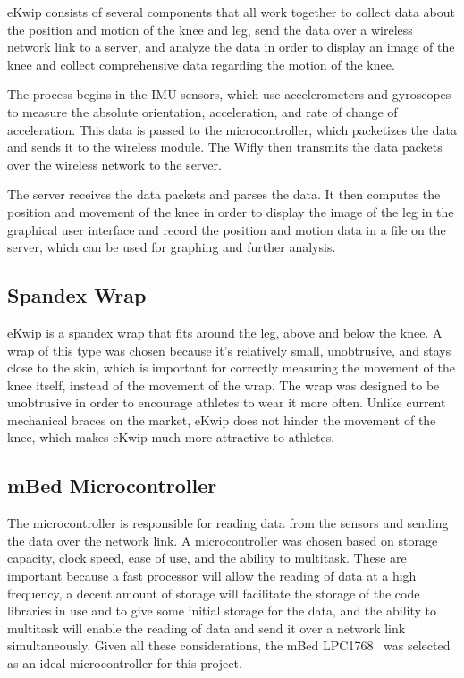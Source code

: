 eKwip consists of several components that all work together to collect data about the position and motion of the knee and leg, send the data over a wireless network link to a server, and analyze the data in order to display an image of the knee and collect comprehensive data regarding the motion of the knee.

The process begins in the IMU sensors, which use accelerometers and gyroscopes to measure the absolute orientation, acceleration, and rate of change of acceleration. This data is passed to the microcontroller, which packetizes the data and sends it to the wireless module. The Wifly then transmits the data packets over the wireless network to the server.

The server receives the data packets and parses the data. It then computes the position and movement of the knee in order to display the image of the leg in the graphical user interface and record the position and motion data in a file on the server, which can be used for graphing and further analysis.

\subsection {Spandex Wrap}
eKwip is a spandex wrap that fits around the leg, above and below the knee. A wrap of this type was chosen because it's relatively small, unobtrusive, and stays close to the skin, which is important for correctly measuring the movement of the knee itself, instead of the movement of the wrap. The wrap was designed to be unobtrusive in order to encourage athletes to wear it more often. Unlike current mechanical braces on the market, eKwip does not hinder the movement of the knee, which makes eKwip much more attractive to athletes.

\subsection {mBed Microcontroller}
The microcontroller is responsible for reading data from the sensors and sending the data over the network link. A microcontroller was chosen based on storage capacity, clock speed, ease of use, and the ability to multitask. These are important because a fast processor will allow the reading of data at a high frequency, a decent amount of storage will facilitate the storage of the code libraries in use and to give some initial storage for the data, and the ability to multitask will enable the reading of data and send it over a network link simultaneously. Given all these considerations, the mBed LPC1768~\cite{mbed} was selected as an ideal microcontroller for this project.

